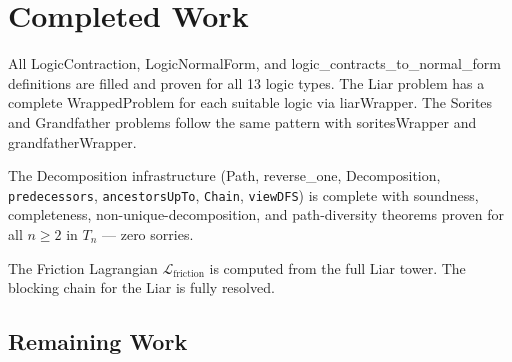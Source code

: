 \section{Completed Work}
\label{sec:completed}

All \textsf{LogicContraction}, \textsf{LogicNormalForm}, and
\textsf{logic\_contracts\_to\_normal\_form} definitions are filled and proven
for all 13 logic types. The Liar problem has a complete \textsf{WrappedProblem}
for each suitable logic via \textsf{liarWrapper}. The Sorites and Grandfather
problems follow the same pattern with \textsf{soritesWrapper} and
\textsf{grandfatherWrapper}.

The Decomposition infrastructure (\textsf{Path}, \textsf{reverse\_one},
\textsf{Decomposition}, \texttt{predecessors}, \texttt{ancestorsUpTo},
\texttt{Chain}, \texttt{viewDFS}) is complete with soundness, completeness,
non-unique-decomposition, and path-diversity theorems proven for all
$n \ge 2$ in $T_n$ — zero sorries.

The Friction Lagrangian $\mathcal{L}_{\text{friction}}$ is computed from the
full Liar tower. The blocking chain for the Liar is fully resolved.

\subsection{Remaining Work}


